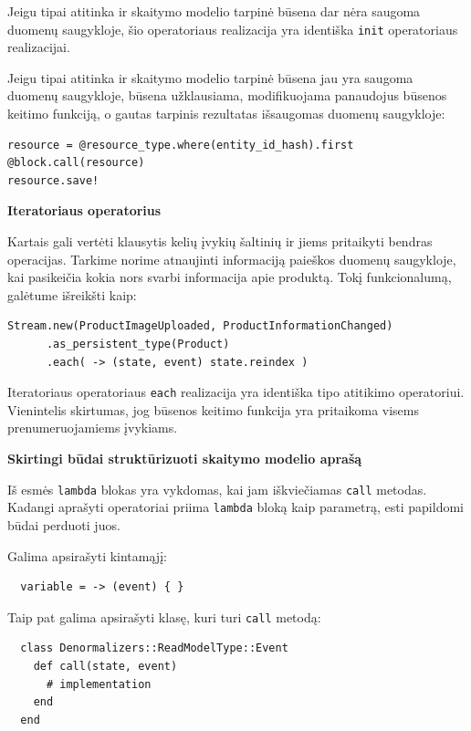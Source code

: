 Jeigu tipai atitinka ir skaitymo modelio tarpinė būsena dar nėra saugoma duomenų saugykloje, šio operatoriaus realizacija yra identiška \lstinline|init| operatoriaus realizacijai.

Jeigu tipai atitinka ir skaitymo modelio tarpinė būsena jau yra saugoma duomenų saugykloje, būsena užklausiama, modifikuojama panaudojus būsenos keitimo funkciją, o gautas tarpinis rezultatas išsaugomas duomenų saugykloje:

\begin{lstlisting}
resource = @resource_type.where(entity_id_hash).first
@block.call(resource)
resource.save!
\end{lstlisting}

\textbf{Iteratoriaus operatorius}

Kartais gali vertėti klausytis kelių įvykių šaltinių ir jiems pritaikyti bendras operacijas. Tarkime norime atnaujinti informaciją paieškos duomenų saugykloje, kai pasikeičia kokia nors svarbi informacija apie produktą. Tokį funkcionalumą, galėtume išreikšti kaip:

\begin{lstlisting}[]
  Stream.new(ProductImageUploaded, ProductInformationChanged)
      .as_persistent_type(Product)
      .each( -> (state, event) state.reindex )
\end{lstlisting}

Iteratoriaus operatoriaus \lstinline|each| realizacija yra identiška tipo atitikimo operatoriui. Vienintelis skirtumas, jog būsenos keitimo funkcija yra pritaikoma visems prenumeruojamiems įvykiams.

\textbf{Skirtingi būdai struktūrizuoti skaitymo modelio aprašą}

Iš esmės \lstinline|lambda| blokas yra vykdomas, kai jam iškviečiamas \lstinline|call| metodas. Kadangi aprašyti operatoriai priima \lstinline|lambda| bloką kaip parametrą, esti papildomi būdai perduoti juos.

Galima apsirašyti kintamąjį:

\begin{lstlisting}
  variable = -> (event) { }
\end{lstlisting}

Taip pat galima apsirašyti klasę, kuri turi \lstinline|call| metodą:

\begin{lstlisting}
  class Denormalizers::ReadModelType::Event
    def call(state, event)
      # implementation
    end
  end
\end{lstlisting}

